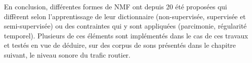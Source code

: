 En conclusion, différentes formes de NMF ont depuis 20 été proposées qui diffèrent selon l'apprentissage de leur dictionnaire (non-supervisée, supervisée et semi-supervisée) ou des contraintes qui y sont appliquées (parcimonie, régularité temporel). Plusieurs de ces éléments sont implémentés dans le cas de ces travaux et testés en vue de déduire, sur des corpus de sons présentés dans le chapitre suivant, le niveau sonore du trafic routier. 


%
%
%
%
%
%


